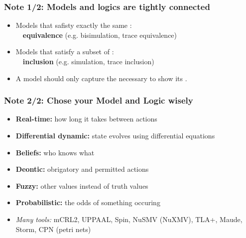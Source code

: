 \documentclass[aspectratio=169]{beamer}
\begin{document}
\begin{frame}[t]\frametitle{Note 1/2: Models and logics are tightly connected}

    \bigskip
    \begin{itemize}
      \item \alert{Models} that safisty exactly the same :
      \\~~\textbf{equivalence} (e.g. bisimulation, trace equivalence)
      \item \alert{Models} that satisfy a subset of :
      \\~~\textbf{inclusion} (e.g. simulation, trace inclusion)
      \item A \alert{model} should only capture the necessary to show its .
    \end{itemize}
\end{frame}


\begin{frame}[t]\frametitle{Note 2/2: Chose your Model and Logic wisely}

  \bigskip
  \begin{itemize}
    \item \textbf{Real-time:} how long it takes between actions
    \item \textbf{Differential dynamic:} state evolves using differential equations
    \item \textbf{Beliefs:} who knows what
    \item \textbf{Deontic:} obrigatory and permitted actions
    \item \textbf{Fuzzy:} other values instead of truth values
    \item \textbf{Probabilistic:} the odds of something occuring
    \item \emph{Many tools:} \alert{mCRL2}, \alert{UPPAAL}, Spin, NuSMV (NuXMV), TLA+, Maude, Storm, CPN (petri nets)
  \end{itemize}
\end{frame}
\end{document}
